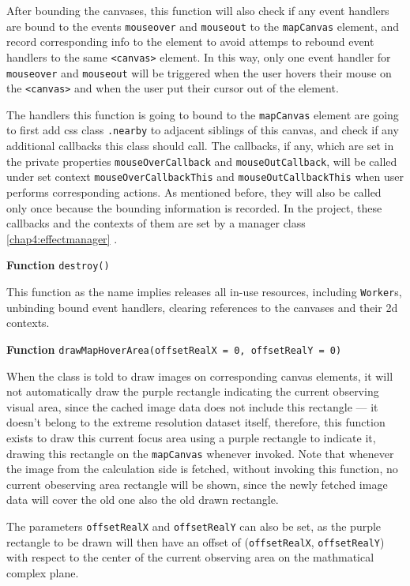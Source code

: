 After bounding the canvases, this function will also check if any event handlers are bound to the events \texttt{mouseover} and \texttt{mouseout} to the \texttt{mapCanvas} element, and record corresponding info to the element to avoid attemps to rebound event handlers to the same \texttt{<canvas>} element. In this way, only one event handler for \texttt{mouseover} and \texttt{mouseout} will be triggered when the user hovers their mouse on the \texttt{<canvas>} and when the user put their cursor out of the element.

The handlers this function is going to bound to the \texttt{mapCanvas} element are going to first add \gls{css} class \texttt{.nearby} to adjacent siblings of this canvas, and check if any additional callbacks this class should call. The callbacks, if any, which are set in the private properties \texttt{mouseOverCallback} and \texttt{mouseOutCallback}, will be called under set context \texttt{mouseOverCallbackThis} and \texttt{mouseOutCallbackThis} when user performs corresponding actions. As mentioned before, they will also be called only once because the bounding information is recorded. In the project, these callbacks and the contexts of them are set by a manager class \ref{chap4:effectmanager} .

\textbf{Function} \verb|destroy()|

This function as the name implies releases all in-use resources, including \texttt{Worker}s, unbinding bound event handlers, clearing references to the canvases and their 2d contexts.

\textbf{Function} \verb|drawMapHoverArea(offsetRealX = 0, offsetRealY = 0)|

When the class is told to draw images on corresponding canvas elements, it will not automatically draw the purple rectangle indicating the current observing visual area, since the cached image data does not include this rectangle --- it doesn't belong to the extreme resolution dataset itself, therefore, this function exists to draw this current focus area using a purple rectangle to indicate it, drawing this rectangle on the \texttt{mapCanvas} whenever invoked. Note that whenever the image from the calculation side is fetched, without invoking this function, no current obeserving area rectangle will be shown, since the newly fetched image data will cover the old one also the old drawn rectangle.

The parameters \texttt{offsetRealX} and \texttt{offsetRealY} can also be set, as the purple rectangle to be drawn will then have an offset of (\texttt{offsetRealX}, \texttt{offsetRealY}) with respect to the center of the current observing area on the mathmatical complex plane.

